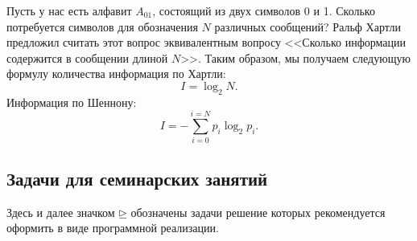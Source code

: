 \documentclass[b5paper,11pt]{book}
\begin{document}
	Пусть у нас есть алфавит $A_{01}$, состоящий из двух символов 0 и 1. Сколько потребуется символов для обозначения $N$ различных сообщений? Ральф Хартли предложил считать этот вопрос эквивалентным вопросу <<Сколько информации содержится в сообщении длиной $N$>>. Таким образом, мы получаем следующую формулу количества информация по Хартли:
	\begin{equation}
		I = \log_2N.
	\end{equation}
	Информация по Шеннону:
	\begin{equation}
		I = -\sum_{i=0}^{i=N} p_i\log_2p_i.
	\end{equation}
	\subsection{Задачи для семинарских занятий}
		Здесь и далее значком $\unrhd$ обозначены задачи решение которых рекомендуется оформить в виде программной реализации.
\end{document}
